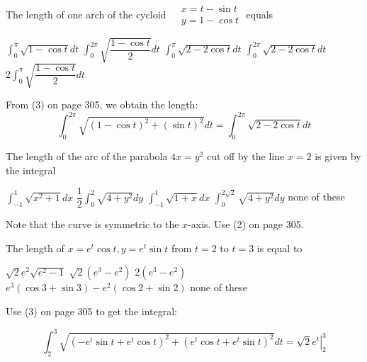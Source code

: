 \question
The length of one arch of the cycloid $\begin{aligned} & x=t-\sin t \\ & y=1-\cos t\end{aligned}$ equals
\begin{choices}
  \choice $\int_{0}^{\pi} \sqrt{1-\cos t} d t$
  \choice $\int_{0}^{2 \pi} \sqrt{\dfrac{1-\cos t}{2}} d t$
  \choice $\int_{0}^{\pi} \sqrt{2-2 \cos t} d t$
  \CorrectChoice $\int_{0}^{2 \pi} \sqrt{2-2 \cos t} d t$
  \choice $2 \int_{0}^{\pi} \sqrt{\dfrac{1-\cos t}{2}} d t$
\end{choices}
\begin{solution}
From (3) on page 305, we obtain the length:
\[
\int_{0}^{2 \pi} \sqrt{(1-\cos t)^{2}+(\sin t)^{2}} d t=\int_{0}^{2 \pi} \sqrt{2-2 \cos t} d t
\]
\end{solution}





\newpage





\question
The length of the arc of the parabola $4 x=y^{2}$ cut off by the line $x=2$ is given by the integral
\begin{choices}
  \choice $\int_{-1}^{1} \sqrt{x^{2}+1} d x$
  \choice $\dfrac{1}{2} \int_{0}^{2} \sqrt{4+y^{2}} d y$
  \choice $\int_{-1}^{1} \sqrt{1+x} d x$
  \CorrectChoice $\int_{0}^{2 \sqrt{2}} \sqrt{4+y^{2}} d y$
  \choice none of these
\end{choices}
\begin{solution}
Note that the curve is symmetric to the $x$-axis. Use (2) on page 305.
\end{solution}

\question
The length of $x=e^{t} \cos t, y=e^{t} \sin t$ from $t=2$ to $t=3$ is equal to
\begin{choices}
  \choice $\sqrt{2} e^{2} \sqrt{e^{2}-1}$
  \CorrectChoice $\sqrt{2}\left(e^{3}-e^{2}\right)$
  \choice $2\left(e^{3}-e^{2}\right)$
  \choice $e^{3}(\cos 3+\sin 3)-e^{2}(\cos 2+\sin 2)$
  \choice none of these



\end{choices}
\begin{solution}
Use (3) on page 305 to get the integral:


\[
\int_{2}^{3} \sqrt{\left(-e^{t} \sin t+e^{t} \cos t\right)^{2}+\left(e^{t} \cos t+e^{t} \sin t\right)^{2}} d t=\left.\sqrt{2} e^{t}\right|_{2} ^{3}
\]


\end{solution}

